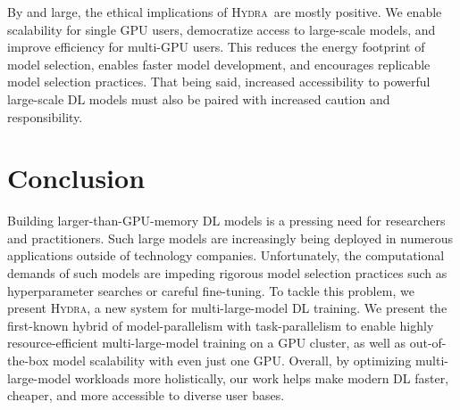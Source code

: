 \documentclass{article}
\newcommand{\system}{\textsc{Hydra}}
\begin{document}
By and large, the ethical implications of \system~are mostly positive. We enable scalability for single GPU users, democratize access to large-scale models, and improve efficiency for multi-GPU users. This reduces the energy footprint of model selection, enables faster model development, and encourages replicable model selection practices. That being said, increased accessibility to powerful large-scale DL models must also be paired with increased caution and responsibility.

\section{Conclusion}
Building larger-than-GPU-memory DL models is a pressing need for researchers and practitioners. Such large models are increasingly being deployed in numerous applications outside of technology companies. Unfortunately, the computational demands of such models are impeding rigorous model selection practices such as hyperparameter searches or careful fine-tuning. To tackle this problem, we present \system, a new system for multi-large-model DL training. We present the first-known hybrid of model-parallelism with task-parallelism to enable highly resource-efficient multi-large-model training on a GPU cluster, as well as out-of-the-box model scalability with even just one GPU. Overall, by optimizing multi-large-model workloads more holistically, our work helps make modern DL faster, cheaper, and more accessible to diverse user bases.



\end{document}
